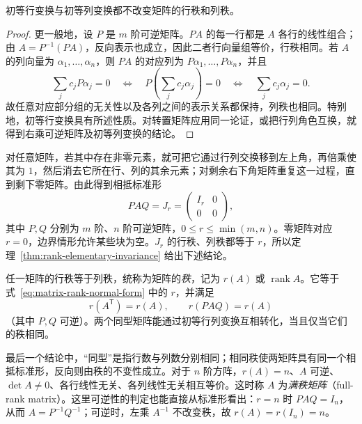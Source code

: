 \begin{theorem}
\label{thm:rank-elementary-invariance}
初等行变换与初等列变换都不改变矩阵的行秩和列秩。
\end{theorem}

\begin{proof}
更一般地，设 $P$ 是 $m$ 阶可逆矩阵。$PA$ 的每一行都是 $A$ 各行的线性组合；由 $A=P^{-1}(PA)$，反向表示也成立，因此二者行向量组等价，行秩相同。若 $A$ 的列向量为 $\alpha_1,\ldots,\alpha_n$，则 $PA$ 的对应列为 $P\alpha_1,\ldots,P\alpha_n$，并且
\[
    \sum_j c_jP\alpha_j=0
    \quad\Longleftrightarrow\quad
    P\left(\sum_j c_j\alpha_j\right)=0
    \quad\Longleftrightarrow\quad
    \sum_j c_j\alpha_j=0.
\]
故任意对应部分组的无关性以及各列之间的表示关系都保持，列秩也相同。特别地，初等行变换具有所述性质。对转置矩阵应用同一论证，或把行列角色互换，就得到右乘可逆矩阵及初等列变换的结论。
\end{proof}

对任意矩阵，若其中存在非零元素，就可把它通过行列交换移到左上角，再倍乘使其为 $1$，然后消去它所在行、列的其余元素；对剩余右下角矩阵重复这一过程，直到剩下零矩阵。由此得到相抵标准形
\begin{equation}
\label{eq:matrix-rank-normal-form}
    PAQ=J_r=\begin{pmatrix}I_r&0\\0&0\end{pmatrix},
\end{equation}
其中 $P,Q$ 分别为 $m$ 阶、$n$ 阶可逆矩阵，$0\leq r\leq\min(m,n)$。零矩阵对应 $r=0$，边界情形允许某些块为空。$J_r$ 的行秩、列秩都等于 $r$，所以定理~\ref{thm:rank-elementary-invariance} 给出下述结论。

\begin{corollary}
\label{cor:row-rank-equals-column-rank}
任一矩阵的行秩等于列秩，统称为矩阵的\emph{秩}，记为 $r(A)$ 或 $\operatorname{rank}A$。它等于式~\eqref{eq:matrix-rank-normal-form} 中的 $r$，并满足
\[
    r(A^{\mathsf T})=r(A),\qquad r(PAQ)=r(A)
\]
（其中 $P,Q$ 可逆）。两个同型矩阵能通过初等行列变换互相转化，当且仅当它们的秩相同。
\end{corollary}

最后一个结论中，“同型”是指行数与列数分别相同；相同秩使两矩阵具有同一个相抵标准形，反向则由秩的不变性成立。对于 $n$ 阶方阵，$r(A)=n$、$A$ 可逆、$\det A\ne0$、各行线性无关、各列线性无关相互等价。这时称 $A$ 为\emph{满秩矩阵}（full-rank matrix）。这里可逆性的判定也能直接从标准形看出：$r=n$ 时 $PAQ=I_n$，从而 $A=P^{-1}Q^{-1}$；可逆时，左乘 $A^{-1}$ 不改变秩，故 $r(A)=r(I_n)=n$。

